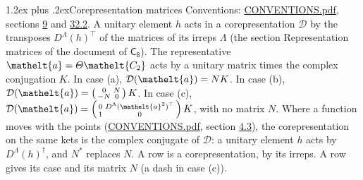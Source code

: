 \documentclass[10pt,a4paper]{article}
\makeatletter
\renewcommand\section{\@startsection{section}{1}{\z@}{-3ex plus -1ex minus -.2ex}%
  {1.2ex plus .2ex}{\normalfont\large\sffamily\bfseries\color{parttitle}}}
\numberwithin{equation}{section}
\newcommand{\eltfont}[1]{{\let\sigma\eltsigma\mathelt{#1}}}
\newcommand{\grp}[1]{\mathsf{#1}}
\newcommand{\elt}[1]{\eltfont{#1}}
\makeatother
\begin{document}
\section{Corepresentation matrices}\label{s:corep_matrices}
Conventions: \href{../../CONVENTIONS.pdf}{CONVENTIONS.pdf}, sections \href{../../../rotation/CONVENTIONS.pdf\#conv.9}{9} and \href{../../CONVENTIONS.pdf\#conv.32.2}{32.2}.
A unitary element $h$ acts in a corepresentation $\mathcal{D}$ by the transposes $D^{\Lambda}(h)^{\top}$ of the matrices of its irreps $\Lambda$ (the section Representation matrices of the document of \href{../../../rotation/data/pdf/C8.pdf}{$\grp{C_{8}}$}). The representative $\elt{a} = \varTheta\elt{C_{2}}$ acts by a unitary matrix times the complex conjugation $K$.
In case (a), $\mathcal{D}(\elt{a}) = NK$. In case (b), $\mathcal{D}(\elt{a}) = \left(\begin{smallmatrix} 0 & N \\ -N & 0 \end{smallmatrix}\right) K$. In case (c), $\mathcal{D}(\elt{a}) = \left(\begin{smallmatrix} 0 & D^{\Lambda}(\elt{a}^2)^{\top} \\ 1 & 0 \end{smallmatrix}\right) K$, with no matrix $N$.
Where a function moves with the points (\href{../../CONVENTIONS.pdf}{CONVENTIONS.pdf}, section \href{../../../rotation/CONVENTIONS.pdf\#conv.4.3}{4.3}), the corepresentation on the same kets is the complex conjugate of $\mathcal{D}$: a unitary element $h$ acts by $D^{\Lambda}(h)^{\dagger}$, and $N^{*}$ replaces $N$.
A row is a corepresentation, by its irreps. A row gives its case and its matrix $N$ (a dash in case (c)).
\end{document}
